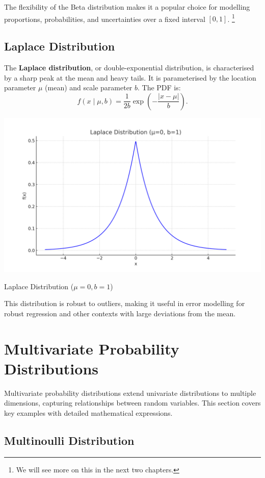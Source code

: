 The flexibility of the Beta distribution makes it a popular choice for modelling proportions, probabilities, and uncertainties over a fixed interval \([0, 1]\). \footnote{We will see more on this in the next two chapters.}


\subsection{Laplace Distribution}

The \textbf{Laplace distribution}, or double-exponential distribution, is characterised by a sharp peak at the mean and heavy tails. It is parameterised by the location parameter $\mu$ (mean) and scale parameter $b$. The PDF is:
\[
    f(x \mid \mu, b) = \frac{1}{2b} \exp\left(-\frac{|x - \mu|}{b}\right).
\]
\begin{marginfigure}
    \includegraphics[width=\linewidth]{img/laplace_distribution.png}
    \caption{Laplace Distribution ($\mu=0, b=1$)}
    \label{fig:laplace}
\end{marginfigure}
This distribution is robust to outliers, making it useful in error modelling for robust regression and other contexts with large deviations from the mean.

\section{Multivariate Probability Distributions}

Multivariate probability distributions extend univariate distributions to multiple dimensions, capturing relationships between random variables. This section covers key examples with detailed mathematical expressions.

\subsection{Multinoulli Distribution}


